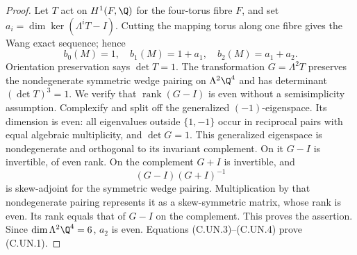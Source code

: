 \begin{proof}
Let $T$ act on $H^1(F,\Q)$ for the four-torus fibre $F$, and set
$a_i=\dim\ker(\Lambda^iT-I)$. Cutting the mapping torus along one
fibre gives the Wang exact sequence; hence
\[
 b_0(M)=1,\quad b_1(M)=1+a_1,\quad b_2(M)=a_1+a_2.
                                                        \tag{C.UN.4}
\]
Orientation preservation says $\det T=1$. The transformation
$G=\Lambda^2T$ preserves the nondegenerate symmetric wedge pairing
on $\Lambda^2\Q^4$ and has determinant $(\det T)^3=1$.
We verify that $\operatorname{rank}(G-I)$ is even without a
semisimplicity assumption. Complexify and split off the generalized
$(-1)$-eigenspace. Its dimension is even: all eigenvalues outside
$\{1,-1\}$ occur in reciprocal pairs with equal algebraic
multiplicity, and $\det G=1$. This generalized eigenspace is
nondegenerate and orthogonal to its invariant complement. On it
$G-I$ is invertible, of even rank. On the complement $G+I$ is
invertible, and
\[
                         (G-I)(G+I)^{-1}
\]
is skew-adjoint for the symmetric wedge pairing. Multiplication by
that nondegenerate pairing represents it as a skew-symmetric matrix,
whose rank is even. Its rank equals that of $G-I$ on the complement.
This proves the assertion. Since $\dim\Lambda^2\Q^4=6$, $a_2$ is
even. Equations (C.UN.3)--(C.UN.4) prove (C.UN.1).
\end{proof}

